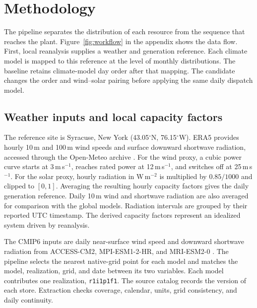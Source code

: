 \section{Methodology}
\label{sec:methodology}
The pipeline separates the distribution of each resource from the sequence that reaches the plant. Figure~\ref{fig:workflow} in the appendix shows the data flow. First, local reanalysis supplies a weather and generation reference. Each climate model is mapped to this reference at the level of monthly distributions. The baseline retains climate-model day order after that mapping. The candidate changes the order and wind--solar pairing before applying the same daily dispatch model.

\subsection{Weather inputs and local capacity factors}
\label{sec:datasets}
The reference site is Syracuse, New York (43.05$^{\circ}$N, 76.15$^{\circ}$W). ERA5 provides hourly 10\,m and 100\,m wind speeds and surface downward shortwave radiation, accessed through the Open-Meteo archive \citep{hersbach2020,openmeteo}. For the wind proxy, a cubic power curve starts at 3\,m\,s$^{-1}$, reaches rated power at 12\,m\,s$^{-1}$, and switches off at 25\,m\,s$^{-1}$. For the solar proxy, hourly radiation in W\,m$^{-2}$ is multiplied by $0.85/1000$ and clipped to $[0,1]$. Averaging the resulting hourly capacity factors gives the daily generation reference. Daily 10\,m wind and shortwave radiation are also averaged for comparison with the global models. Radiation intervals are grouped by their reported UTC timestamp. The derived capacity factors represent an idealized system driven by reanalysis.

The CMIP6 inputs are daily near-surface wind speed and downward shortwave radiation from ACCESS-CM2, MPI-ESM1-2-HR, and MRI-ESM2-0 \citep{eyring2016,pangeo}. The pipeline selects the nearest native-grid point for each model and matches the model, realization, grid, and date between its two variables. Each model contributes one realization, \texttt{r1i1p1f1}. The source catalog records the version of each store. Extraction checks coverage, calendar, units, grid consistency, and daily continuity.

